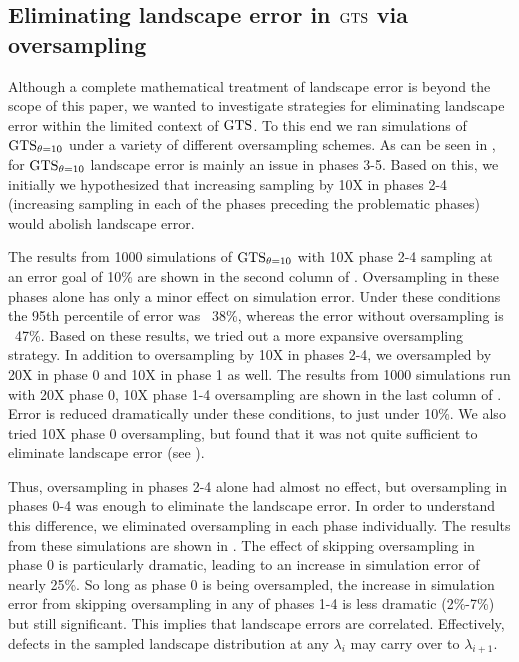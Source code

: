 \subsection{Eliminating landscape error in $\text{GTS}$ via oversampling}
\label{sec:oversampling}

Although a complete mathematical treatment of landscape error is beyond the scope of this paper, we wanted to investigate strategies for eliminating landscape error within the limited context of $\text{GTS}$. To this end we ran  simulations of $\text{GTS}_{\theta=10}$ under a variety of different oversampling schemes. As can be seen in , for $\text{GTS}_{\theta=10}$ landscape error is mainly an issue in phases 3-5. Based on this, we initially we hypothesized that increasing sampling by 10X in phases 2-4 (\ie increasing sampling in each of the phases preceding the problematic phases) would abolish landscape error.

The results from 1000 simulations of $\text{GTS}_{\theta=10}$ with 10X phase 2-4 sampling at an error goal of 10\% are shown in the second column of . Oversampling in these phases alone has only a minor effect on simulation error. Under these conditions the 95th percentile of error was ~38\%, whereas the error without oversampling is ~47\%. Based on these results, we tried out a more expansive oversampling strategy. In addition to oversampling by 10X in phases 2-4, we oversampled by 20X in phase 0 and 10X in phase 1 as well. The results from 1000 simulations run with 20X phase 0, 10X phase 1-4 oversampling are shown in the last column of . Error is reduced dramatically under these conditions, to just under 10\%. We also tried 10X phase 0 oversampling, but found that it was not quite sufficient to eliminate landscape error (see ).

Thus, oversampling in phases 2-4 alone had almost no effect, but oversampling in phases 0-4 was enough to eliminate the landscape error. In order to understand this difference, we eliminated oversampling in each phase individually. The results from these simulations are shown in . The effect of skipping oversampling in phase 0 is particularly dramatic, leading to an increase in simulation error of nearly 25\%. So long as phase 0 is being oversampled, the increase in simulation error from skipping oversampling in any of phases 1-4 is less dramatic (2\%-7\%) but still significant. This implies that landscape errors are correlated. Effectively, defects in the sampled landscape distribution at any $\lambda_i$ may carry over to $\lambda_{i+1}$.

